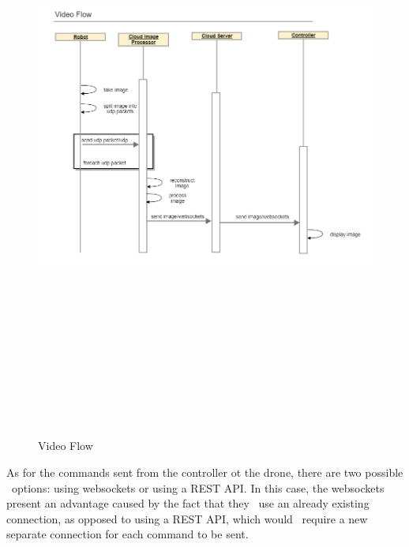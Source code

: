 \begin{figure}[ht]
    \label{fig:video-flow}
    \includegraphics[width=15cm, height=20cm,keepaspectratio]{img/video-flow.png}
    \caption{Video Flow}
\end{figure}

As for the commands sent from the controller ot the drone, there are two possible \
options: using websockets or using a REST API.
In this case, the websockets present an advantage caused by the fact that they \
use an already existing connection, as opposed to using a REST API, which would \
require a new separate connection for each command to be sent.

